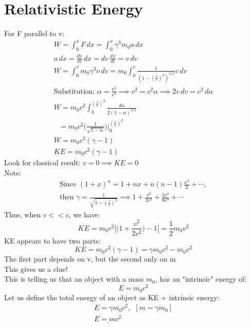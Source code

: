 \documentclass[a4paper, 11pt, fleqn, normalem]{report}
\begin{document}
\section{Relativistic Energy}
For F parallel to v:
\begin{gather*}
    W = \int_{0}^{x} F\,dx = \int_{0}^{x} \gamma^{3} m_{0}a\,dx \\
    a\,dx = \frac{dv}{dt}\,dx = dv\,\frac{dx}{dt} = v\,dv \\
    W = \int_{0}^{v} m_{0}\gamma^{3}v\,dv = m_{0}\int_{0}^{v} \frac{1}{(1 - (\tfrac{v}{c})^{2})^{3/2}}v\,dv \\
    \text{Substitution: }\alpha = \frac{v^{2}}{c^{2}} \implies v^{2} = c^{2}\alpha \implies 2v\,dv = c^{2}\,d\alpha \\
    W = m_{0}c^{2}\int_{0}^{(\tfrac{v}{c})^{2}} \frac{d\alpha}{2(1 - \alpha)^{3/2}} \\
    ~~~ = m_{0}c^{2}\Big(\frac{1}{\sqrt{1 - \alpha}}\Big)\Bigg|_{0}^{(\tfrac{v}{c})^{2}} \\
    W = m_{0}c^{2}(\gamma - 1) \\
    KE = m_{0}c^{2}(\gamma - 1)
\end{gather*}
Look for classical result: $v = 0 \implies KE = 0$ \\
Note:
\begin{gather*}
    \text{Since }(1 + x)^{n} = 1 + nx + n(n - 1)\frac{x^{2}}{2} + \cdots,\\
    \text{then }\gamma = \frac{1}{\sqrt{1 - (\tfrac{v}{c})^{2}}} \implies 1 + \frac{v^{2}}{2c^{2}} + \frac{3v^{4}}{8c^{4}} + \cdots
\end{gather*}
Thus, when $v << c$, we have:
\begin{equation*}
    KE  = m_{0}c^{2}\Big[\Big(1 + \frac{v^{2}}{2c^{2}}\Big) - 1\Big] = \frac{1}{2}m_{0}v^{2}
\end{equation*}
KE appears to have two parts:
\begin{equation*}
    KE = m_{0}c^{2}(\gamma - 1) = \gamma m_{0}c^{2} - m_{0}c^{2}
\end{equation*}
The first part depends on v, but the second only on m \\
This gives us a clue! \\
This is telling us that an object with a mass $m_{0}$, has an "intrinsic" energy of:
\begin{equation*}
    E = m_{0}c^{2}
\end{equation*}
Let us define the total energy of an object as KE + intrinsic energy:
\begin{gather*}
    E = \gamma m_{0}c^{2},~~[m = \gamma m_{0}] \\
    \underline{E = mc^{2}}
\end{gather*}
\end{document}
